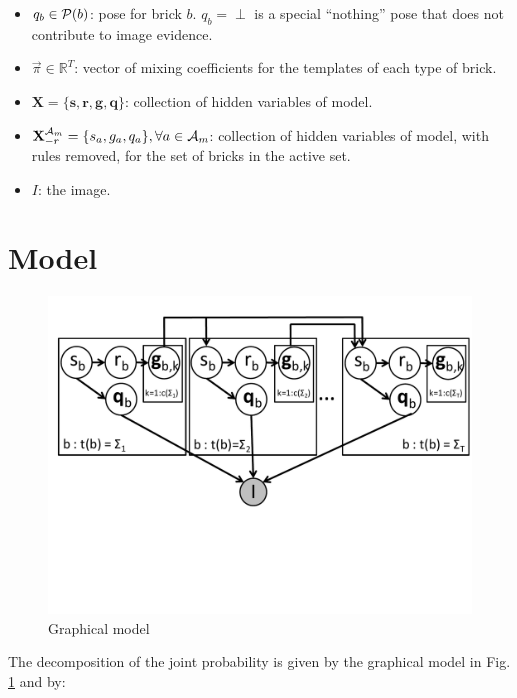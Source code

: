 \documentclass[11pt]{article}
\newcommand{\Pose}{{\cal P}}
\newcommand{\A}{{\cal A}}
\newcommand{\X}{\mathbf{X}}
\newcommand{\Xrm}{\X^{\Am}_{-r}}
\newcommand{\Am}{\A_{m}}
\newcommand{\Real}{\mathbb{R}}
\begin{document}
\begin{itemize}
\item $q_b \in \Pose(b)$: pose for brick $b$. $q_b = \perp$ is a special ``nothing'' pose that does not contribute to image evidence.

\item $\vec{\pi} \in \Real^T$: vector of mixing coefficients for the templates of each type of brick.

\item $\X = \{ \mathbf{s}, \mathbf{r}, \mathbf{g}, \mathbf{q}\}$: collection of hidden variables of model.

\item $\Xrm = \{s_a, g_a, q_a\}, \forall a \in \Am$: collection of hidden variables of model, with rules removed, for the set of bricks in the active set.

\item $I$: the image.

\end{itemize}

\section{Model}

\begin{figure}[htbp]
\begin{center}
\includegraphics[width=\textwidth, trim=0cm 6cm 0cm 0cm]{gm.pdf}
\caption{Graphical model}
\label{gm}
\end{center}
\end{figure}

\FloatBarrier

The decomposition of the joint probability is given by the graphical model in Fig. \ref{gm} and by: \\
\end{document}
